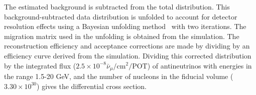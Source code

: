 The estimated background is subtracted from the total distribution. This
background-subtracted data distribution is unfolded to account for detector
resolution effects 
using a Bayesian unfolding method~\cite{agostini:1995} with two iterations. 
The migration matrix used in the unfolding is obtained from the simulation. 
The reconstruction efficiency and acceptance corrections are made by dividing by
an efficiency curve derived from the simulation. 
Dividing this corrected distribution by the integrated flux
($2.5\times10^{-8}\bar{\nu}_\mu/\text{cm}^2/\text{POT}$) of antineutrinos with
energies in the range 1.5-20 GeV, 
and the number of nucleons in the fiducial volume ($3.30\times10^{30}$) gives
the differential cross section. 

